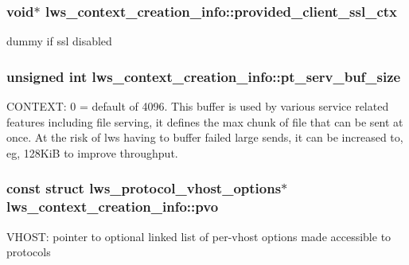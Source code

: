\subsubsection[{\texorpdfstring{provided\+\_\+client\+\_\+ssl\+\_\+ctx}{provided\_client\_ssl\_ctx}}]{\setlength{\rightskip}{0pt plus 5cm}void$\ast$ lws\+\_\+context\+\_\+creation\+\_\+info\+::provided\+\_\+client\+\_\+ssl\+\_\+ctx}\hypertarget{structlws__context__creation__info_a0e790dda6202604f73a03b6149bc12bb}{}\label{structlws__context__creation__info_a0e790dda6202604f73a03b6149bc12bb}
dummy if ssl disabled 
\subsubsection[{\texorpdfstring{pt\+\_\+serv\+\_\+buf\+\_\+size}{pt\_serv\_buf\_size}}]{\setlength{\rightskip}{0pt plus 5cm}unsigned int lws\+\_\+context\+\_\+creation\+\_\+info\+::pt\+\_\+serv\+\_\+buf\+\_\+size}\hypertarget{structlws__context__creation__info_a57f88c0745adbd1d6b9b619b8de30209}{}\label{structlws__context__creation__info_a57f88c0745adbd1d6b9b619b8de30209}
C\+O\+N\+T\+E\+XT\+: 0 = default of 4096. This buffer is used by various service related features including file serving, it defines the max chunk of file that can be sent at once. At the risk of lws having to buffer failed large sends, it can be increased to, eg, 128\+KiB to improve throughput. 
\subsubsection[{\texorpdfstring{pvo}{pvo}}]{\setlength{\rightskip}{0pt plus 5cm}const struct {\bf lws\+\_\+protocol\+\_\+vhost\+\_\+options}$\ast$ lws\+\_\+context\+\_\+creation\+\_\+info\+::pvo}\hypertarget{structlws__context__creation__info_a999866fcd15dbd621773436f97190458}{}\label{structlws__context__creation__info_a999866fcd15dbd621773436f97190458}
V\+H\+O\+ST\+: pointer to optional linked list of per-\/vhost options made accessible to protocols 
